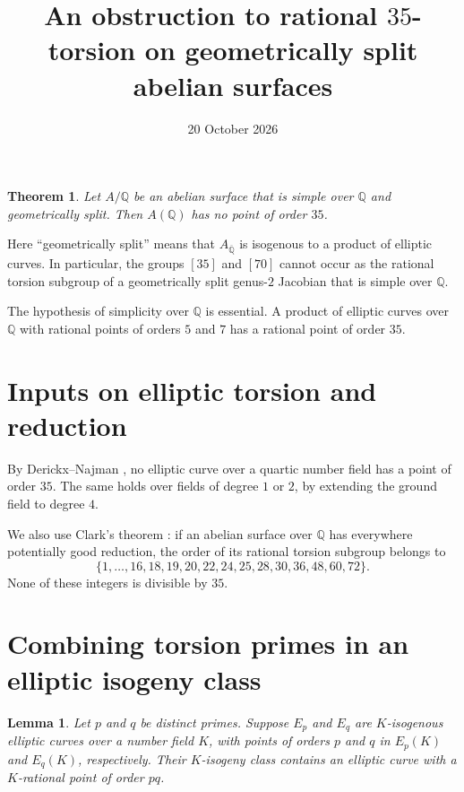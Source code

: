 \documentclass[11pt]{article}
\title{An obstruction to rational \(35\)-torsion on geometrically split
abelian surfaces}
\author{}
\date{20 October 2026}
\newtheorem{theorem}{Theorem}
\newtheorem{lemma}{Lemma}
\newcommand{\Q}{\mathbb Q}
\begin{document}
\maketitle

\begin{theorem}\label{thm:main}
Let \(A/\Q\) be an abelian surface that is simple over \(\Q\) and
geometrically split. Then \(A(\Q)\) has no point of order \(35\).
\end{theorem}

Here ``geometrically split'' means that
\(A_{\overline{\Q}}\) is isogenous to a product of elliptic curves.
In particular, the groups \([35]\) and \([70]\) cannot occur as the
rational torsion subgroup of a geometrically split genus-\(2\)
Jacobian that is simple over \(\Q\).

The hypothesis of simplicity over \(\Q\) is essential. A product
of elliptic curves over \(\Q\) with rational points of orders \(5\)
and \(7\) has a rational point of order \(35\).

\section{Inputs on elliptic torsion and reduction}

By Derickx--Najman \cite[Theorem 1.1]{DN}, no elliptic curve over
a quartic number field has a point of order \(35\). The same holds
over fields of degree \(1\) or \(2\), by extending the ground field
to degree \(4\).

We also use Clark's theorem \cite[Theorem 5]{Clark}: if an abelian
surface over \(\Q\) has everywhere potentially good reduction, the
order of its rational torsion subgroup belongs to
\[
 \{1,\ldots,16,18,19,20,22,24,25,28,30,36,48,60,72\}.
\]
None of these integers is divisible by \(35\).

\section{Combining torsion primes in an elliptic isogeny class}

\begin{lemma}\label{lem:combine}
Let \(p\) and \(q\) be distinct primes. Suppose \(E_p\) and \(E_q\)
are \(K\)-isogenous elliptic curves over a number field \(K\), with
points of orders \(p\) and \(q\) in \(E_p(K)\) and \(E_q(K)\),
respectively. Their \(K\)-isogeny class contains an elliptic curve
with a \(K\)-rational point of order \(pq\).
\end{lemma}
\end{document}
